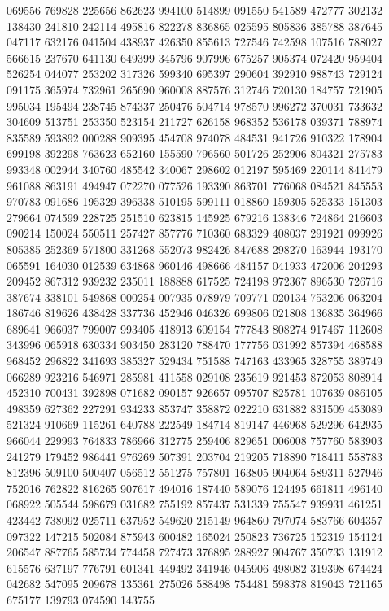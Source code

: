 {069556 769828 225656 862623 994100 514899 091550 541589 472777 302132 138430%
241810 242114 495816 822278 836865 025595 805836 385788 387645 047117 632176%
041504 438937 426350 855613 727546 742598 107516 788027 566615 237670 641130%
649399 345796 907996 675257 905374 072420 959404 526254 044077 253202 317326%
599340 695397 290604 392910 988743 729124 091175 365974 732961 265690 960008%
887576 312746 720130 184757 721905 995034 195494 238745 874337 250476 504714%
978570 996272 370031 733632 304609 513751 253350 523154 211727 626158 968352%
536178 039371 788974 835589 593892 000288 909395 454708 974078 484531 941726%
910322 178904 699198 392298 763623 652160 155590 796560 501726 252906 804321%
275783 993348 002944 340760 485542 340067 298602 012197 595469 220114 841479%
961088 863191 494947 072270 077526 193390 863701 776068 084521 845553 970783%
091686 195329 396338 510195 599111 018860 159305 525333 151303 279664 074599%
228725 251510 623815 145925 679216 138346 724864 216603 090214 150024 550511%
257427 857776 710360 683329 408037 291921 099926 805385 252369 571800 331268%
552073 982426 847688 298270 163944 193170 065591 164030 012539 634868 960146%
498666 484157 041933 472006 204293 209452 867312 939232 235011 188888 617525%
724198 972367 896530 726716 387674 338101 549868 000254 007935 078979 709771%
020134 753206 063204 186746 819626 438428 337736 452946 046326 699806 021808%
136835 364966 689641 966037 799007 993405 418913 609154 777843 808274 917467%
112608 343996 065918 630334 903450 283120 788470 177756 031992 857394 468588%
968452 296822 341693 385327 529434 751588 747163 433965 328755 389749 066289%
923216 546971 285981 411558 029108 235619 921453 872053 808914 452310 700431%
392898 071682 090157 926657 095707 825781 107639 086105 498359 627362 227291%
934233 853747 358872 022210 631882 831509 453089 521324 910669 115261 640788%
222549 184714 819147 446968 529296 642935 966044 229993 764833 786966 312775%
259406 829651 006008 757760 583903 241279 179452 986441 976269 507391 203704%
219205 718890 718411 558783 812396 509100 500407 056512 551275 757801 163805%
904064 589311 527946 752016 762822 816265 907617 494016 187440 589076 124495%
661811 496140 068922 505544 598679 031682 755192 857437 531339 755547 939931%
461251 423442 738092 025711 637952 549620 215149 964860 797074 583766 604357%
097322 147215 502084 875943 600482 165024 250823 736725 152319 154124 206547%
887765 585734 774458 727473 376895 288927 904767 350733 131912 615576 637197%
776791 601341 449492 341946 045906 498082 319398 674424 042682 547095 209678%
135361 275026 588498 754481 598378 819043 721165 675177 139793 074590 143755%
}
